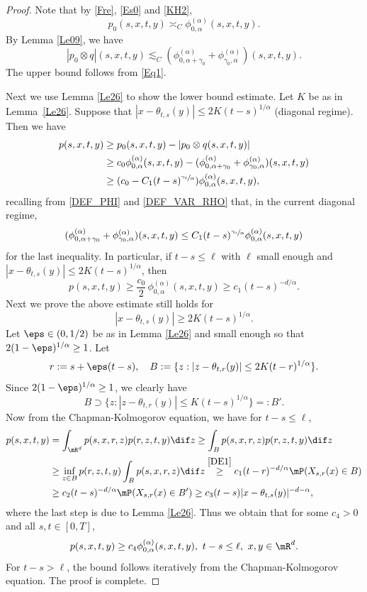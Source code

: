\begin{proof}
Note that by \eqref{Fre}, \eqref{Es0} and \eqref{KH2},
\[
p_0(s,x,t,y)\asymp_C\phi^{(\alpha)}_{0,\alpha}(s,x,t,y).
\]
By Lemma \ref{Le09}, we have
\begin{equation*}
|p_0\otimes q|(s,x,t,y)
\lesssim_C(\phi^{(\alpha)}_{0,\alpha+\gamma_0}+\phi^{(\alpha)}_{\gamma_0,\alpha})(s,x,t,y).
\end{equation*}
The upper bound follows from \eqref{Eq1}.

Next we use Lemma \ref{Le26} to show the lower bound estimate. Let $K$ be as in Lem\-ma~\ref{Le26}.
Suppose that $|x-\theta_{t,s}(y)|\leq 2K(t-s)^{1/\alpha}$ {(diagonal regime)}. Then we have
\begin{align*}
p(s,x,t,y)&\geq p_0(s,x,t,y)-|p_0\otimes q(s,x,t,y)|
\\&\geq c_0\phi^{(\alpha)}_{0,\alpha}(s,x,t,y)-(\phi^{(\alpha)}_{0,\alpha+\gamma_0}+\phi^{(\alpha)}_{\gamma_0,\alpha})(s,x,t,y)
\\&\geq (c_0-C_1(t-s)^{\sfrac{\gamma_0}{\alpha}})\phi^{(\alpha)}_{0,\alpha}(s,x,t,y),
\end{align*}
{recalling from \eqref{DEF_PHI} and \eqref{DEF_VAR_RHO} that, in the current diagonal regime,
\[
(\phi^{(\alpha)}_{0,\alpha+\gamma_0}+\phi^{(\alpha)}_{\gamma_0,\alpha})(s,x,t,y)\le C_1(t-s)^{\sfrac{\gamma_0}{\alpha}}\phi^{(\alpha)}_{0,\alpha}(s,x,t,y)
\]
for the last inequality}.
In particular, if $t-s\leq\ell$ with $\ell$ small enough and $|x-\theta_{t,s}(y)|\leq 2K(t-s)^{1/\alpha}$, then
\begin{equation}\label{DE1}
p(s,x,t,y)\geq \frac{c_0}{2}\,\phi^{(\alpha)}_{0,\alpha}(s,x,t,y)\geq c_1(t-s)^{-d/\alpha}.
\end{equation}
Next we prove the above estimate still holds for
\[
|x-\theta_{t,s}(y)|\geq 2K(t-s)^{1/\alpha}.
\]
Let $\eps\in(0,1/2)$ be as in Lemma \ref{Le26} and small enough
so that $2(1-\eps)^{1/\alpha}\geq 1$. Let
\[
r:=s+\eps(t-s),\quad B:=\{z: |z-\theta_{t,r}(y)|\leq 2K(t-r)^{1/\alpha}\}.
\]
Since $2(1-\eps)^{1/\alpha}\geq 1$, we clearly have
\[
B\supset\{z: |z-\theta_{t,r}(y)|\leq K(t-s)^{1/\alpha}\}=:B'.
\]
Now from the Chapman-Kolmogorov equation, we have for $t-s\leq\ell$,
\begin{align*}
p(s,x,t,y)&=\int_{\mR^d}p(s,x,r,z)p(r,z,t,y)\dif z
\geq\int_B p(s,x,r,z)p(r,z,t,y)\dif z
\\&\geq\inf_{z\in B}p(r,z,t,y)\int_B p(s,x,r,z)\dif z
\stackrel{\eqref{DE1}}{\geq} c_1(t-r)^{-d/\alpha}\mP(X_{s,r}(x)\in B)
\\&\geq c_2(t-s)^{-d/\alpha}\mP(X_{s,r}(x)\in B')
\geq c_3(t-s)|x-\theta_{t,s}(y)|^{-d-\alpha},
\end{align*}
where the last step is due to Lemma \ref{Le26}.
Thus we obtain that for some $c_4>0$ and all $s,t\in[0,T]$,
\[
p(s,x,t,y)\geq c_4\phi^{(\alpha)}_{0,\alpha}(s,x,t,y),\ t-s\leq\ell, \ x,y\in\mR^d.
\]
For $t-s>\ell$, the bound follows iteratively from the Chapman-Kolmogorov equation.
The proof is complete.
\end{proof}
